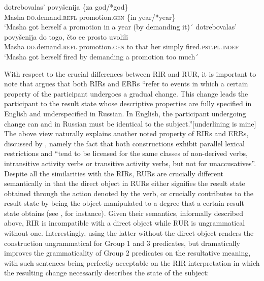\documentclass[output=paper,colorlinks,citecolor=brown]{./langscibook}
\begin{document}
\ea%
    \label{ex:antonyuk:43}
    \ea \label{ex:antonyuk:43a}
       {dotrebovalas’}          {povyšenija}       {\{za} {god/*god\}}\\
    Masha \textsc{do}.demand.\textsc{refl} promotion.\textsc{gen} \{in year/*year\}\\
    \glt `Masha got herself  a promotion in a year (by demanding it)´
    \ex \label{ex:antonyuk:43b}
       {dotrebovalas’}            {povyšenija}            {do} {togo,} {čto} {ee}   {prosto} uvolili\\
    Masha \textsc{do}.demand.\textsc{refl}   promotion.\textsc{gen}     to that {} her simply fired.\textsc{pst.pl.indef}\\
    \glt `Masha got herself fired by demanding a promotion too much´
    \z
\z

With respect to the crucial differences between RIR and RUR, it is important to note that \citet{Tatevosov2010} argues that both RIRs and ERRs “refer to events in which a certain property of the participant undergoes a gradual change. This change leads the participant to the result state whose descriptive properties are fully specified in English and underspecified in Russian. In English, the participant undergoing change can and in Russian must be identical to the subject.”[underlining is mine] The above view naturally explains another noted property of RIRs and ERRs, discussed by \citeauthor{Tatevosov2010}, namely the fact that both constructions exhibit parallel lexical restrictions and “tend to be licensed for the same classes of non-derived verbs, intransitive activity verbs or transitive activity verbs, but not for unaccusatives”. Despite all the similarities with the RIRs, RURs are crucially different semantically in that the direct object in RURs either signifies the result state obtained through the action denoted by the verb, or crucially contributes to the result state by being the object manipulated to a degree that a certain result state obtains (see , for instance). Given their semantics, informally described above, RIR is incompatible with a direct object while RUR is ungrammatical without one. Interestingly, using the latter without the direct object renders the construction ungrammatical for Group 1 and 3 predicates, but dramatically improves the grammaticality of Group 2 predicates on the resultative meaning, with such sentences being perfectly acceptable on the RIR interpretation in which the resulting change necessarily describes the state of the subject:
\end{document}
